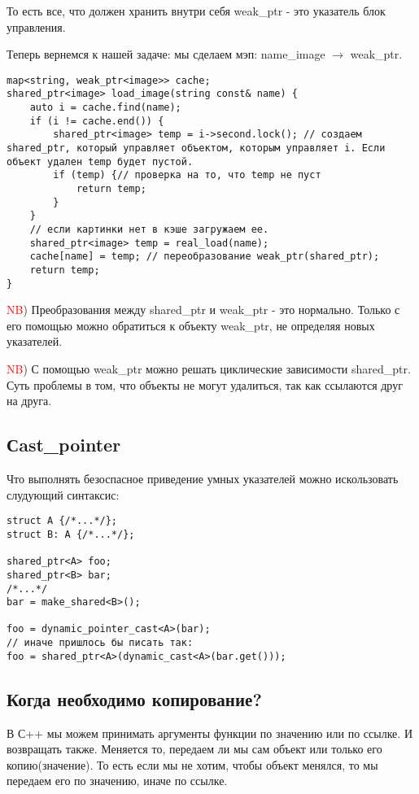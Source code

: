 \documentclass[12pt]{article}
\begin{document}
То есть все, что должен хранить внутри себя weak\_ptr - это указатель блок управления.


Теперь вернемся к нашей задаче: мы сделаем мэп: name\_image $\to$ weak\_ptr.
\begin{verbatim}
map<string, weak_ptr<image>> cache;
shared_ptr<image> load_image(string const& name) {
    auto i = cache.find(name);
    if (i != cache.end()) {
        shared_ptr<image> temp = i->second.lock(); // создаем shared_ptr, который управляет объектом, которым управляет i. Если объект удален temp будет пустой.
        if (temp) {// проверка на то, что temp не пуст
            return temp;
        }
    }
    // если картинки нет в кэше загружаем ее.
    shared_ptr<image> temp = real_load(name);
    cache[name] = temp; // переобразование weak_ptr(shared_ptr);
    return temp;
}

\end{verbatim}


\textcolor{red}{NB}) Преобразования между shared\_ptr и weak\_ptr - это нормально. Только с его помощью можно обратиться к объекту weak\_ptr, не определяя новых указателей.


\textcolor{red}{NB}) С помощью weak\_ptr можно решать циклические зависимости shared\_ptr. Суть проблемы в том, что объекты не могут удалиться, так как ссылаются друг на друга.

\subsection{Сast\_pointer}
Что выполнять безоспасное приведение умных указателей можно искользовать слудующий синтаксис:
\begin{verbatim}
struct A {/*...*/};
struct B: A {/*...*/};

shared_ptr<A> foo;
shared_ptr<B> bar;
/*...*/
bar = make_shared<B>();

foo = dynamic_pointer_cast<A>(bar);
// иначе пришлось бы писать так:
foo = shared_ptr<A>(dynamic_cast<A>(bar.get()));

\end{verbatim}

\subsection{Когда необходимо копирование?}
В С++ мы можем принимать аргументы функции по значению или по ссылке. И возвращать также. Меняется то, передаем ли мы сам объект или только его копию(значение). То есть если мы не хотим, чтобы объект менялся, то мы передаем его по значению, иначе по ссылке.
\end{document}
